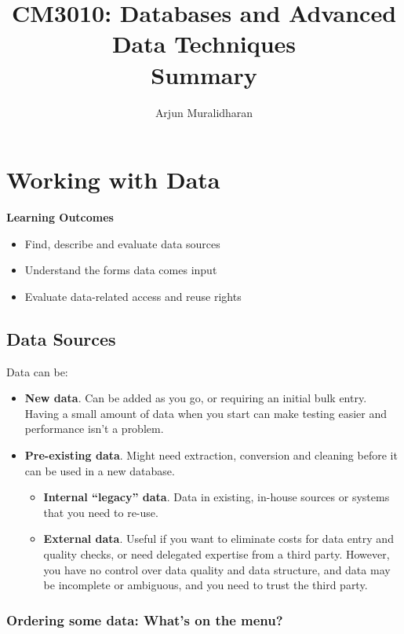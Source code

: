 \title{CM3010: Databases and Advanced Data Techniques \\ Summary}
\author{Arjun Muralidharan}



\section{Working with Data}
\begin{mdframed}
\textbf{Learning Outcomes}
\begin{itemize}[label={\checkmark}]
\item Find, describe and evaluate data sources
\item Understand the forms data comes input
\item Evaluate data-related access and reuse rights
\end{itemize}
\end{mdframed}

\subsection{Data Sources}
Data can be:

\begin{itemize}
    \item \textbf{New data}. Can be added as you go, or requiring an initial bulk entry. Having a small amount of data when you start can make testing easier and performance isn't a problem.
    \item \textbf{Pre-existing data}. Might need extraction, conversion and cleaning before it can be used in a new database.
    \begin{itemize}
        \item \textbf{Internal ``legacy'' data}. Data in existing, in-house sources or systems that you need to re-use.
        \item \textbf{External data}. Useful if you want to eliminate costs for data entry and quality checks, or need delegated expertise from a third party. However, you have no control over data quality and data structure, and data may be incomplete or ambiguous, and you need to trust the third party. 
    \end{itemize}
\end{itemize}


\subsubsection{Ordering some data: What's on the menu?}

